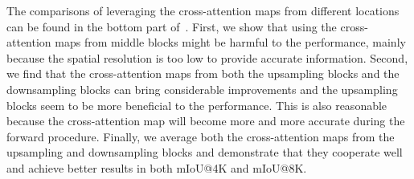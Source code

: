 \documentclass[10pt,twocolumn,letterpaper]{article}
\begin{document}
The comparisons of leveraging the cross-attention maps from different locations can be found in the bottom part of~. First, we show that using the cross-attention maps from middle blocks might be harmful to the performance, mainly because the spatial resolution is too low to provide accurate information. Second, we find that the cross-attention maps from both the upsampling blocks and the downsampling blocks can bring considerable improvements and the upsampling blocks seem to be more beneficial to the performance. This is also reasonable because the cross-attention map will become more and more accurate during the forward procedure. Finally, we average both the cross-attention maps from the upsampling and downsampling blocks and demonstrate that they cooperate well and achieve better results in both mIoU@4K and mIoU@8K.


\begin{table}[t]
  \centering
  \caption{\textbf{Ablation studies.} We perform ablations in semantic segmentation on ADE20K~\cite{zhou2017ade} to verify the effectiveness of each of the proposed components in VPD and the influence of the different choices of cross-attention maps. We find that all the proposed components are beneficial and that combining the cross-attention maps in the downsampling blocks and the upsampling blocks yields the best performance.}\vspace{3pt} 
  \label{tab:ablation}\vspace{-15pt}
\end{table}
\end{document}
